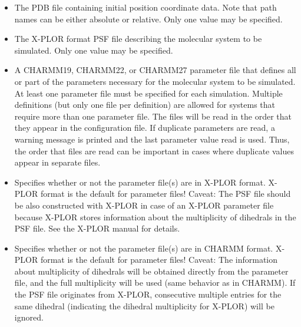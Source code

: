 \begin{itemize}
\item
{}
{\label{param:coordinates}
The PDB file containing initial position coordinate data.  
Note that path names can be either absolute or relative.  
Only one value may be specified.}

\item
{}
{\label{param:structure}
The X-PLOR format PSF file describing the molecular 
system to be simulated.  
Only one value may be specified.}

\item
{}
{\label{param:parameters}
A CHARMM19, CHARMM22, or CHARMM27 parameter file that defines all or part 
of the parameters necessary for the molecular system to be simulated.  
At least one parameter file must be specified for each simulation.  
Multiple definitions (but only one file per definition)
are allowed for systems that require more than one parameter file.
The files will be read 
in the order that they appear in the configuration file.  If duplicate
parameters are read, a warning message is printed and the last
parameter value read is used.  Thus, the order that files are read 
can be important in cases where duplicate values appear in 
separate files.}

\item
{}
{Specifies whether or not the parameter file(s) are in X-PLOR format.
 X-PLOR format is the default for parameter files!
 Caveat: The PSF file should be also constructed with X-PLOR in
 case of an X-PLOR parameter file because X-PLOR stores information
 about the multiplicity of dihedrals in the PSF file. See the X-PLOR
 manual for details.}

\item
{}
{Specifies whether or not the parameter file(s) are in CHARMM format.
 X-PLOR format is the default for parameter files!
 Caveat: The information about multiplicity of dihedrals will be
 obtained directly from the parameter file, and the full multiplicity
 will be used (same behavior as in CHARMM). If the PSF file originates
 from X-PLOR, consecutive multiple entries for the same dihedral 
 (indicating the dihedral multiplicity for X-PLOR) will be ignored.}


\end{itemize}
